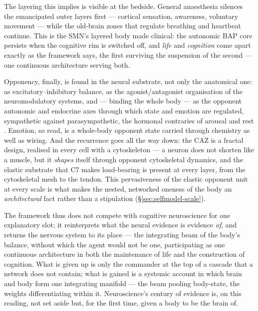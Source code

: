 \documentclass{article}
\begin{document}
The layering this implies is visible at the bedside.  General anaesthesia
silences the emancipated outer layers first --- cortical sensation,
awareness, voluntary movement --- while the old-brain zones that regulate
breathing and heartbeat continue.  This is the SMN's layered body made
clinical: the autonomic BAP core persists when the cognitive rim is
switched off, and \emph{life} and \emph{cognition} come apart exactly as
the framework says, the first surviving the suspension of the second ---
one continuous architecture serving both.

Opponency, finally, is found in the neural substrate, not only the
anatomical one: as excitatory--inhibitory balance, as the
agonist/antagonist organisation of the neuromodulatory systems, and ---
binding the whole body --- as the opponent autonomic and endocrine axes
through which state and emotion are regulated, sympathetic against
parasympathetic, the hormonal contraries of arousal and rest
\citep{Craig2002HowDoYouFeel,BarrettSimmons2015Interoceptive,Seth2013InteroceptiveInference}.
Emotion, so read, is a whole-body opponent state carried through chemistry
as well as wiring.  And the recurrence goes all the way down: the CAZ is a
fractal design, realised in every cell with a cytoskeleton --- a neuron
does not shorten like a muscle, but it \emph{shapes} itself through opponent
cytoskeletal dynamics, and the elastic substrate that C7 makes load-bearing is
present at every layer, from the cytoskeletal mesh to the tendon.  This
pervasiveness of the elastic opponent unit at every scale is what makes the
nested, networked oneness of the body an \emph{architectural} fact rather
than a stipulation (\S\ref{sec:selfmodel-scale}).

The framework thus does not compete with cognitive neuroscience for one
explanatory slot; it reinterprets what the neural evidence is evidence
\emph{of}, and returns the nervous system to its place --- the integrating
beam of the body's balance, without which the agent would not be one,
participating as one continuous architecture in both the maintenance of
life and the construction of cognition.  What is given up is only the
commander at the top of a cascade that a network does not contain; what is
gained is a systemic account in which brain and body form one integrating
manifold --- the beam pooling body-state, the weights differentiating within
it.  Neuroscience's century of evidence is, on this reading, not set
aside but, for the first time, given a body to be the brain of.

\end{document}
